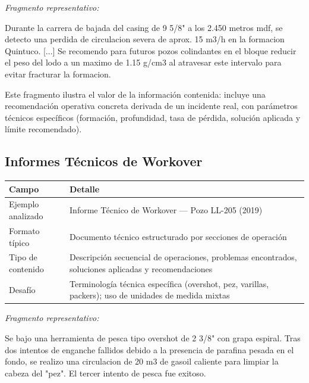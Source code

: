\documentclass[12pt, a4paper]{article}
\begin{document}
\vspace{6pt}
\textit{Fragmento representativo:}

\begin{fragmentbox}
Durante la carrera de bajada del casing de 9 5/8" a los 2.450 metros mdf, se detecto
una perdida de circulacion severa de aprox. 15 m3/h en la formacion Quintuco. [...]
Se recomendo para futuros pozos colindantes en el bloque reducir el peso del lodo a
un maximo de 1.15 g/cm3 al atravesar este intervalo para evitar fracturar la formacion.
\end{fragmentbox}

Este fragmento ilustra el valor de la informaci\'{o}n contenida: incluye una recomendaci\'{o}n
operativa concreta derivada de un incidente real, con par\'{a}metros t\'{e}cnicos
espec\'{i}ficos (formaci\'{o}n, profundidad, tasa de p\'{e}rdida, soluci\'{o}n aplicada y
l\'{i}mite recomendado).

\subsection{Informes T\'{e}cnicos de Workover}

\begin{tabularx}{\textwidth}{BL}
  \toprule
  \textbf{Campo} & \textbf{Detalle} \\
  \midrule
  Ejemplo analizado   & Informe T\'{e}cnico de Workover --- Pozo LL-205 (2019) \\
  \addlinespace
  Formato t\'{i}pico  & Documento t\'{e}cnico estructurado por secciones de operaci\'{o}n \\
  \addlinespace
  Tipo de contenido   & Descripci\'{o}n secuencial de operaciones, problemas encontrados,
                        soluciones aplicadas y recomendaciones \\
  \addlinespace
  Desaf\'{i}o         & Terminolog\'{i}a t\'{e}cnica espec\'{i}fica (overshot, pez, varillas,
                        packers); uso de unidades de medida mixtas \\
  \bottomrule
\end{tabularx}

\vspace{6pt}
\textit{Fragmento representativo:}

\begin{fragmentbox}
Se bajo una herramienta de pesca tipo overshot de 2 3/8" con grapa espiral. Tras dos
intentos de enganche fallidos debido a la presencia de parafina pesada en el fondo,
se realizo una circulacion de 20 m3 de gasoil caliente para limpiar la cabeza del "pez".
El tercer intento de pesca fue exitoso.
\end{fragmentbox}
\end{document}
